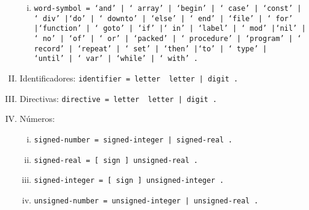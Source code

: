 \begin{enumerate}[I.]
\begin{enumerate}[i.]
\item \texttt{word-symbol = \textquoteleft and\textquoteright\ | \textquoteleft
array\textquoteright\ | \textquoteleft begin\textquoteright\ | \textquoteleft
case\textquoteright\ | \textquoteleft const\textquoteright\ | \textquoteleft
div\textquoteright
               |\textquoteleft do\textquoteright\ | \textquoteleft
downto\textquoteright\ | \textquoteleft else\textquoteright\ | \textquoteleft
end\textquoteright\ | \textquoteleft file\textquoteright\ | \textquoteleft
for\textquoteright
               |\textquoteleft function\textquoteright\ | \textquoteleft
goto\textquoteright\ | \textquoteleft if\textquoteright\ |\textquoteleft
in\textquoteright\ | \textquoteleft label\textquoteright\ | \textquoteleft
mod\textquoteright
               |\textquoteleft nil\textquoteright\ | \textquoteleft
no\textquoteright\ | \textquoteleft of\textquoteright\ | \textquoteleft
or\textquoteright\ | \textquoteleft packed\textquoteright\ | \textquoteleft
procedure\textquoteright
               | \textquoteleft program\textquoteright\ | \textquoteleft
record\textquoteright\ | \textquoteleft repeat\textquoteright\ | \textquoteleft
set\textquoteright\ | \textquoteleft then\textquoteright
               |\textquoteleft to\textquoteright\ | \textquoteleft
type\textquoteright\ | \textquoteleft until\textquoteright\ | \textquoteleft
var\textquoteright\ | \textquoteleft while\textquoteright\ | \textquoteleft
with\textquoteright\ .}
               
\end{enumerate}

\item Identificadores: \texttt{identifier = letter { letter | digit }.}

\item Directivas: \texttt{directive = letter { letter | digit }.}

\item Números:

\begin{enumerate}[i.]

\item \texttt{signed-number = signed-integer | signed-real .}

\item \texttt{signed-real = [ sign ] unsigned-real .}

\item \texttt{signed-integer = [ sign ] unsigned-integer .}

\item \texttt{unsigned-number = unsigned-integer | unsigned-real .}


\end{enumerate}
\end{enumerate}
